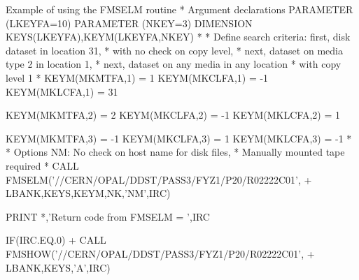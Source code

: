 \begin{XMPt}{Example of using the FMSELM routine}
*     Argument declarations
      PARAMETER (LKEYFA=10)
      PARAMETER (NKEY=3)
      DIMENSION KEYS(LKEYFA),KEYM(LKEYFA,NKEY)
*
*     Define search criteria: first, disk dataset in location 31,
*        with no check on copy level,
*                             next, dataset on media type 2 in location 1,
*                             next, dataset on any media in any location 
*                             with copy level 1
*
      KEYM(MKMTFA,1) = 1
      KEYM(MKCLFA,1) = -1
      KEYM(MKLCFA,1) = 31

      KEYM(MKMTFA,2) = 2
      KEYM(MKCLFA,2) = -1
      KEYM(MKLCFA,2) = 1

      KEYM(MKMTFA,3) = -1
      KEYM(MKCLFA,3) = 1
      KEYM(MKLCFA,3) = -1
*
*     Options NM: No check on host name for disk files,
*                 Manually mounted tape required
*
      CALL FMSELM('//CERN/OPAL/DDST/PASS3/FYZ1/P20/R02222C01',
     +   LBANK,KEYS,KEYM,NK,'NM',IRC)

      PRINT *,'Return code from FMSELM = ',IRC

      IF(IRC.EQ.0)
     +   CALL FMSHOW('//CERN/OPAL/DDST/PASS3/FYZ1/P20/R02222C01',
     +                LBANK,KEYS,'A',IRC)


\end{XMPt}
